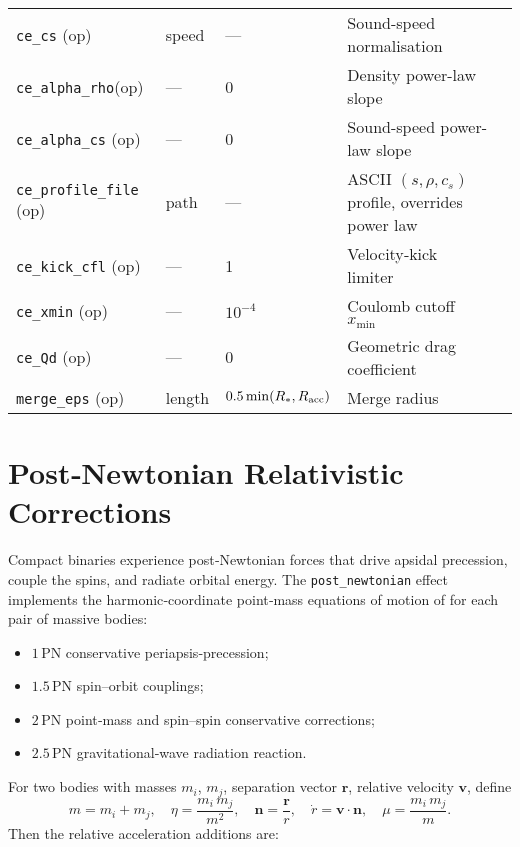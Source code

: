 \documentclass[11pt]{article}
\begin{document}
\begin{table}[h]
\begin{tabular}{@{}lllll@{}}
\texttt{ce\_cs}         (op) & speed   & — & Sound-speed normalisation\\
\texttt{ce\_alpha\_rho}(op) & —       & 0 & Density power-law slope\\
\texttt{ce\_alpha\_cs} (op) & —       & 0 & Sound-speed power-law slope\\
\texttt{ce\_profile\_file}  (op) & path & — & ASCII $(s,\rho,c_s)$ profile, overrides power law\\
\texttt{ce\_kick\_cfl}      (op) & — & 1 & Velocity‑kick limiter\\
\texttt{ce\_xmin}           (op) & — & $10^{-4}$ & Coulomb cutoff $x_{\min}$\\
\texttt{ce\_Qd}             (op) & — & 0 & Geometric drag coefficient\\[0.2em]
\texttt{merge\_eps}         (op) & length & $0.5\min(R_*,R_{\rm acc})$ & Merge radius\\
\bottomrule
\end{tabular}
\end{table}

\section{Post‐Newtonian Relativistic Corrections}

Compact binaries experience post‐Newtonian forces that drive apsidal
precession, couple the spins, and radiate orbital energy.  The
\texttt{post\_newtonian} effect implements the harmonic‐coordinate
point‐mass equations of motion of \citet{Kidder1995} for each pair of
massive bodies:
\begin{itemize}[nosep,leftmargin=1.8em]
  \item $1$\,PN conservative periapsis‐precession;
  \item $1.5$\,PN spin–orbit couplings;
  \item $2$\,PN point‐mass and spin–spin conservative corrections;
  \item $2.5$\,PN gravitational‐wave radiation reaction.
\end{itemize}

\medskip
\noindent
For two bodies with masses $m_i$, $m_j$, separation vector $\mathbf{r}$,
relative velocity $\mathbf{v}$, define
\[
  m = m_i + m_j,\quad
  \eta = \frac{m_i\,m_j}{m^2},\quad
  \mathbf{n} = \frac{\mathbf{r}}{r},\quad
  \dot r = \mathbf{v}\cdot\mathbf{n},\quad
  \mu = \frac{m_i\,m_j}{m}.
\]
Then the relative acceleration additions are:
\end{document}

